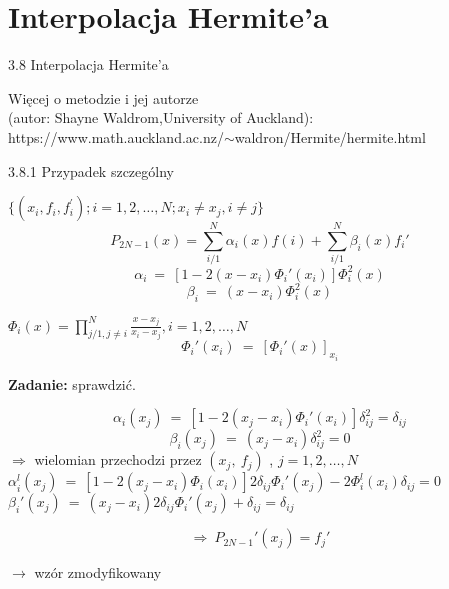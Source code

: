 \section{Interpolacja Hermite'a}
\begin{frame}
{3.8 Interpolacja Hermite'a}

Więcej o metodzie i jej autorze \\
(autor: Shayne Waldrom,University of Auckland):\\
\vspace{5mm}
https://www.math.auckland.ac.nz/$\sim$waldron/Hermite/hermite.html
\end{frame}

\begin{frame}
{3.8.1 Przypadek szczególny}

$\{(x_{i}, f_{i}, f_{i}^{'}); i=1,2, \dots, N; x_{i}\neq x_{j}, i\neq j\}$
$$
P_{2N-1}(x)=\sum_{i/1}^{N}\alpha_{i}(x)f(i)+\sum_{i/1}^{N}\beta_{i}(x)f_{i}'
$$
$$
\alpha_{i}\ =\ [1-2(x-x_{i})\Phi_{i}'(x_{i})]\Phi_{i}^{2}(x)
$$
$$
\beta_{i}\ =\ (x-x_{i})\Phi_{i}^{2}(x)
$$
\begin{center}
$\Phi_{i}(x) = \displaystyle \prod_{j/1,j\neq i}^{N}\frac{x-x_{j}}{x_{i}-x_{j}}, i=1, 2,\dots, N$
$$
\Phi_{i}'(x_{i})\ =\ [\Phi_{i}'(x)]_{x_{i}}
$$
\end{center}
\textbf{Zadanie:} sprawdzić.


\end{frame}

\begin{frame}
$$
\alpha_{i}(x_{j})\ =\ [1-2(x_{j}-x_{i})\Phi_{i}'(x_{i})]\delta_{ij}^{2}=\delta_{ij}
$$
$$
\beta_{i}(x_{j})\ =\ (x_{j}-x_{i})\delta_{ij}^{2}=0
$$
$\Rightarrow$ wielomian przechodzi przez $(x_{j},\ f_{j})$ , $j=1,2, \dots, N$ \\
\vspace{3mm}
$\alpha_{i}^{l}(x_{j})\ =\ [1-2(x_{j}-x_{i})\Phi_{i}(x_{i})]2\delta_{ij}\Phi_{i}'(x_{j})-2\Phi_{i}^{l}(x_{i})\delta_{ij}=0$ \\
\vspace{3mm}
$\beta_{i}'(x_{j})\ =\ (x_{j}-x_{i})2\delta_{ij}\Phi_{i}'(x_{j})+\delta_{ij}=\delta_{ij}$

$$
\Rightarrow\ P_{2N-1}'(x_{j})=f_{j}'
$$
\begin{flushright}$\rightarrow$ wzór zmodyfikowany \end{flushright}
\end{frame}

